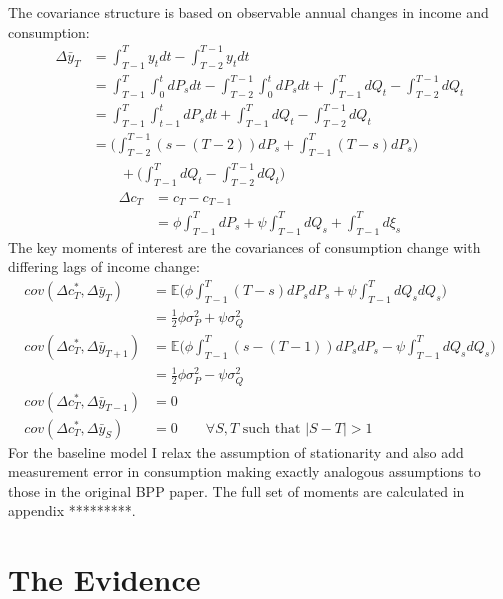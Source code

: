 \documentclass[titlepage]{\econtex}\newcommand{\texname}{BPP_PSID_TimeAgg}
\begin{document}
The covariance structure is based on observable annual changes in income and consumption:
\begin{align}
\Delta \bar{y}_T &= \int_{T-1}^{T} y_t dt - \int_{T-2}^{T-1} y_t dt \nonumber \\ 
&= \int_{T-1}^{T} \int_{0}^{t}dP_s dt -\int_{T-2}^{T-1} \int_{0}^{t}dP_s dt +  \int_{T-1}^{T} dQ_t -\int_{T-2}^{T-1} dQ_t \nonumber \\
&= \int_{T-1}^{T} \int_{t-1}^{t}dP_s dt +  \int_{T-1}^{T} dQ_t -\int_{T-2}^{T-1} dQ_t \nonumber \\
&= \Big(\int_{T-2}^{T-1} (s-(T-2))dP_s  + \int_{T-1}^{T} (T-s)dP_s \Big) \nonumber \\
& \qquad + \Big(\int_{T-1}^{T} dQ_t -\int_{T-2}^{T-1} dQ_t \Big) \label{deltay}
\end{align}
\begin{align}
\Delta c_T &= c_T - c_{T-1} \nonumber  \\
&= \phi  \int_{T-1}^{T} dP_s  +\psi \int_{T-1}^{T}dQ_s +\int_{T-1}^{T}d\xi_s  \label{deltac}
\end{align}
The key moments of interest are the covariances of consumption change with differing lags of income change:
\begin{align}
cov(\Delta c_T^*, \Delta \bar{y}_T) &=  \mathbb{E} \Big( \phi \int_{T-1}^{T} (T-s) dP_s dP_s + \psi \int_{T-1}^{T} dQ_s dQ_s \Big) \nonumber \\
&= \frac{1}{2} \phi \sigma^2_P + \psi \sigma^2_Q \\
cov(\Delta c_T^*, \Delta \bar{y}_{T+1}) &=  \mathbb{E} \Big( \phi \int_{T-1}^{T} (s-(T-1)) dP_s dP_s - \psi \int_{T-1}^{T} dQ_s dQ_s \Big) \nonumber \\
&= \frac{1}{2} \phi \sigma^2_P - \psi \sigma^2_Q \\
cov(\Delta c_T^*, \Delta \bar{y}_{T-1}) &= 0 \\
cov(\Delta c_T^*, \Delta \bar{y}_{S}) &= 0 \qquad \forall S,T \text{ such that }|S-T| >1 
\end{align}
For the baseline model I relax the assumption of stationarity and also add measurement error in consumption making exactly analogous assumptions to those in the original BPP paper. The full set of moments are calculated in appendix *********.
\section{The Evidence}



%

\processdelayedfloats

\pagebreak\appendix

\end{document}
